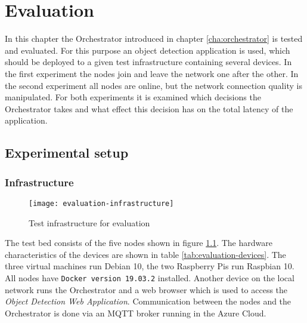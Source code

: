 \chapter{Evaluation\label{cha:evaluation}}

In this chapter the Orchestrator introduced in chapter \ref{cha:orchestrator} is tested and evaluated. For this purpose an object detection application is used, which should be deployed to a given test infrastructure containing several devices. In the first experiment the nodes join and leave the network one after the other. In the second experiment all nodes are online, but the network connection quality is manipulated. For both experiments it is examined which decisions the Orchestrator takes and what effect this decision has on the total latency of the application.

\section{Experimental setup}

\subsection{Infrastructure\label{sec:eval-infrastructure}}

\begin{figure}[htb]
    \centering
    \texttt{[image: evaluation-infrastructure]}
    \caption{Test infrastructure for evaluation}
    \label{fig:evaluation-infrastructure}
\end{figure}

The test bed consists of the five nodes shown in figure \ref{fig:evaluation-infrastructure}. The hardware characteristics of the devices are shown in table \ref{tab:evaluation-devices}. The three virtual machines run Debian 10, the two Raspberry Pis run Raspbian 10. All nodes have \texttt{Docker version 19.03.2} installed. Another device on the local network runs the Orchestrator and a web browser which is used to access the \textit{Object Detection Web Application}. Communication between the nodes and the Orchestrator is done via an MQTT broker running in the Azure Cloud.

